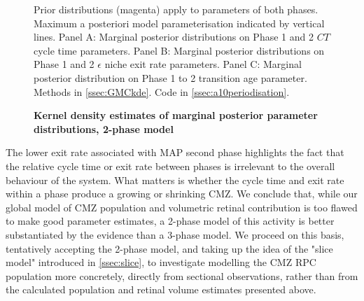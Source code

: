 \documentclass{ut-thesis}
\begin{document}
\begin{NoHyper}
\begin{figure}[!h]
    \caption{{\bf Kernel density estimates of marginal posterior parameter distributions, 2-phase model}}
    Prior distributions (magenta) apply to parameters of both phases. Maximum a posteriori model parameterisation indicated by vertical lines.
    Panel A: Marginal posterior distributions on Phase 1 and 2 $CT$ cycle time parameters. 
    Panel B: Marginal posterior distributions on Phase 1 and 2 $\epsilon$ niche exit rate parameters.
    Panel C: Marginal posterior distribution on Phase 1 to 2 transition age parameter.
    \label{phasemarginals}
    Methods in \autoref{ssec:GMCkde}.
    Code in \autoref{ssec:a10periodisation}.    
\end{figure}

The lower exit rate associated with MAP second phase highlights the fact that the relative cycle time or exit rate between phases is irrelevant to the overall behaviour of the system. What matters is whether the cycle time and exit rate within a phase produce a growing or shrinking CMZ. We conclude that, while our global model of CMZ population and volumetric retinal contribution is too flawed to make good parameter estimates, a 2-phase model of this activity is better substantiated by the evidence than a 3-phase model. We proceed on this basis, tentatively accepting the 2-phase model, and taking up the idea of the "slice model" introduced in \autoref{ssec:slice}, to investigate modelling the CMZ RPC population more concretely, directly from sectional observations, rather than from the calculated population and retinal volume estimates presented above.


\end{NoHyper}
\end{document}
